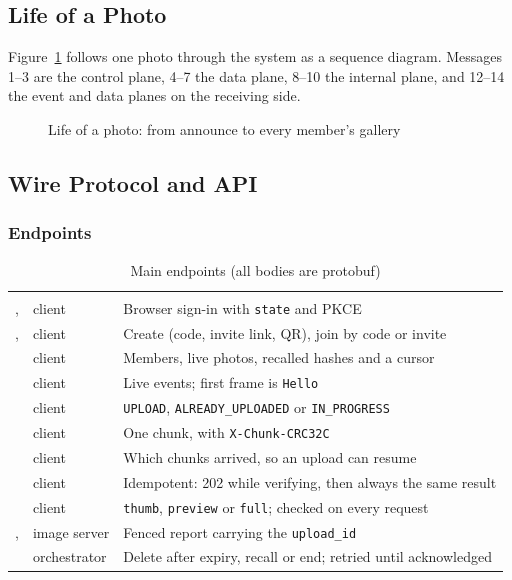 \subsection{Life of a Photo}

Figure~\ref{fig:seq} follows one photo through the system as a sequence diagram. Messages 1--3 are the control plane, 4--7 the data plane, 8--10 the internal plane, and 12--14 the event and data planes on the receiving side.

\begin{figure}[H]
\centering
{}
\caption{Life of a photo: from announce to every member's gallery}\label{fig:seq}
\end{figure}

\subsection{Wire Protocol and API}

\subsubsection{Endpoints}

\begin{table}[H]
\centering
\small\stripes
\begin{tabularx}{\linewidth}{L{6.4cm}L{1.9cm}Y}
\headrow {} &  & \\
,  & client & Browser sign-in with \texttt{state} and PKCE \\
,  & client & Create (code, invite link, QR), join by code or invite \\
 & client & Members, live photos, recalled hashes and a cursor \\
 & client & Live events; first frame is \texttt{Hello} \\
 & client & \texttt{UPLOAD}, \texttt{ALREADY\_UPLOADED} or \texttt{IN\_PROGRESS} \\
 & client & One chunk, with \texttt{X-Chunk-CRC32C} \\
 & client & Which chunks arrived, so an upload can resume \\
 & client & Idempotent: 202 while verifying, then always the same result \\
 & client & \texttt{thumb}, \texttt{preview} or \texttt{full}; checked on every request \\
,  & image server & Fenced report carrying the \texttt{upload\_id} \\
 & orchestrator & Delete after expiry, recall or end; retried until acknowledged \\
\end{tabularx}
\caption{Main endpoints (all bodies are protobuf)}\label{tab:endpoints}
\end{table}

